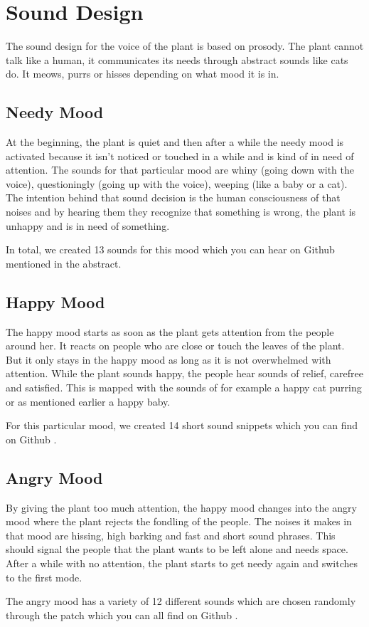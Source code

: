 \section{Sound Design}


The sound design for the voice of the plant is based on prosody. The plant cannot talk like a human, it communicates its needs through abstract sounds like cats do. It meows, purrs or hisses depending on what mood it is in.


\subsection{Needy Mood}
At the beginning, the plant is quiet and then after a while the needy mood is activated because it isn't noticed or touched in a while and is kind of in need of attention. The sounds for that particular mood are whiny (going down with the voice), questioningly (going up with the voice), weeping (like a baby or a cat). The intention behind that sound decision is the human consciousness of that noises and by hearing them they recognize that something is wrong, the plant is unhappy and is in need of something.  

In total, we created 13 sounds for this mood which you can hear on Github \cite{github} mentioned in the abstract. 



\subsection{Happy Mood}
The happy mood starts as soon as the plant gets attention from the people around her. It reacts on people who are close or touch the leaves of the plant. But it only stays in the happy mood as long as it is not overwhelmed with attention. While the plant sounds happy, the people hear sounds of relief, carefree and satisfied. This is mapped with the sounds of for example a happy cat purring  or as mentioned earlier a happy baby. 

For this particular mood, we created 14 short sound snippets which you can find on  Github \cite{github}.



\subsection{Angry Mood}

By giving the plant too much attention, the happy mood changes into the angry mood where the plant rejects the fondling of the people. The noises it makes in that mood are hissing, high barking and  fast and short sound phrases. This should signal the people that the  plant wants to be left alone and needs space. 
After a while with no attention, the plant starts to get needy again and switches to the first mode.

The angry mood has a variety of 12 different sounds which are chosen randomly through the patch which you can all find on  Github \cite{github}.
